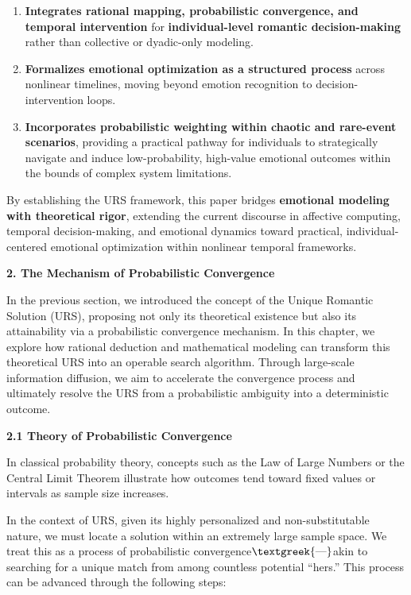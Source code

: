 \documentclass[a4paper]{article}
\begin{document}
\begin{enumerate}[series=listWWNumxxix,label=\arabic*.,ref=\arabic*]
\item \textbf{Integrates rational mapping, probabilistic convergence, and temporal intervention} for
\textbf{individual-level romantic decision-making} rather than collective or dyadic-only modeling.
\item \textbf{Formalizes emotional optimization as a structured process} across nonlinear timelines, moving beyond
emotion recognition to decision-intervention loops.
\item \textbf{Incorporates probabilistic weighting within chaotic and rare-event scenarios}, providing a practical
pathway for individuals to strategically navigate and induce low-probability, high-value emotional outcomes within the
bounds of complex system limitations.
\end{enumerate}
By establishing the URS framework, this paper bridges \textbf{emotional modeling with theoretical rigor}, extending the
current discourse in affective computing, temporal decision-making, and emotional dynamics toward practical,
individual-centered emotional optimization within nonlinear temporal frameworks.


\bigskip

{\centering\color[HTML]{595959}
\textbf{2. The Mechanism of Probabilistic Convergence}
\par}

In the previous section, we introduced the concept of the Unique Romantic Solution (URS), proposing not only its
theoretical existence but also its attainability via a probabilistic convergence mechanism. In this chapter, we explore
how rational deduction and mathematical modeling can transform this theoretical URS into an operable search algorithm.
Through large-scale information diffusion, we aim to accelerate the convergence process and ultimately resolve the URS
from a probabilistic ambiguity into a deterministic outcome.

\textbf{2.1 Theory of Probabilistic Convergence}

In classical probability theory, concepts such as the Law of Large Numbers or the Central Limit Theorem illustrate how
outcomes tend toward fixed values or intervals as sample size increases.

In the context of URS, given its highly personalized and non-substitutable nature, we must locate a solution within an
extremely large sample space. We treat this as a process of probabilistic convergence$\text{\textgreek{—}}$akin to
searching for a unique match from among countless potential “hers.” This process can be advanced through the following
steps:
\end{document}
